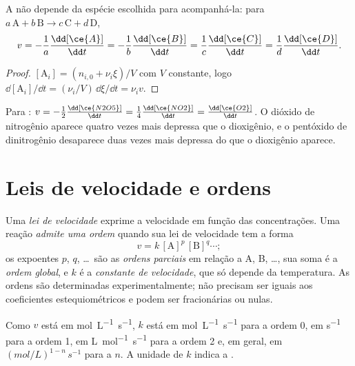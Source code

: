 \begin{proposition}\label{prop:b1:rate-laws:rate-relations}
A  não depende da espécie escolhida para
acompanhá-la: para $a\,\mathrm{A} + b\,\mathrm{B} \longrightarrow c\,\mathrm{C} + d\,\mathrm{D}$,
\[
  v = -\frac1a\frac{\dd[\ce{A}]}{\dd t} = -\frac1b\frac{\dd[\ce{B}]}{\dd t}
  = \frac1c\frac{\dd[\ce{C}]}{\dd t} = \frac1d\frac{\dd[\ce{D}]}{\dd t} .
\]
\end{proposition}

\begin{proof}
$[\mathrm{A}_i] = (n_{i,0} + \nu_i\xi)/V$ com $V$ constante, logo
$\dd[\mathrm{A}_i]/\dd t = (\nu_i/V)\,\dd\xi/\dd t = \nu_i v$.
\end{proof}

\begin{example}\label{ex:b1:rate-laws:n2o5}
Para : $v = -\frac12\frac{\dd[\ce{N2O5}]}{\dd t} =
\frac14\frac{\dd[\ce{NO2}]}{\dd t} = \frac{\dd[\ce{O2}]}{\dd t}$. O dióxido
de nitrogênio aparece quatro vezes mais depressa que o dioxigênio, e o
pentóxido de dinitrogênio desaparece duas vezes mais depressa do que o
dioxigênio aparece.
\end{example}

\section{Leis de velocidade e ordens}

\begin{definition}\label{def:b1:rate-laws:order}
Uma \emph{lei de velocidade} exprime a velocidade
em função das concentrações. Uma reação \emph{admite uma ordem} quando
sua lei de velocidade tem a forma
\[
  v = k\,[\mathrm{A}]^{p}\,[\mathrm{B}]^{q} \cdots ;
\]
os expoentes $p$, $q$, \dots\ são as \emph{ordens parciais}
em relação a A, B, \dots, sua soma é a \emph{ordem
global}, e $k$ é a \emph{constante de velocidade},
que só depende da temperatura. As ordens são determinadas
experimentalmente; não precisam ser iguais aos coeficientes
estequiométricos e podem ser fracionárias ou nulas.
\end{definition}

\begin{remark}[Unidades de $k$]\label{rem:b1:rate-laws:units}
Como $v$ está em \unit{mol.L^{-1}.s^{-1}}, $k$ está em
\unit{mol.L^{-1}.s^{-1}} para a ordem 0, em \unit{s^{-1}} para a ordem 1,
em \unit{L.mol^{-1}.s^{-1}} para a ordem 2 e, em geral, em
$(\unit{mol/L})^{1-n}\,\unit{s^{-1}}$ para a  $n$. A unidade
de $k$ indica a .
\end{remark}

